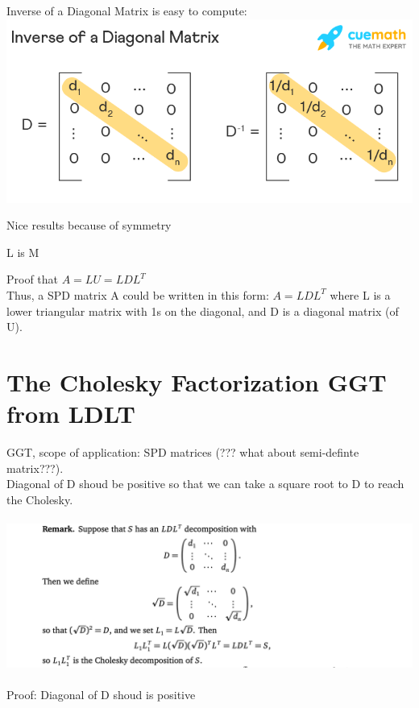 \documentclass{article}
\begin{document}
\noindent
Inverse of a Diagonal Matrix is easy to compute:\\
\includegraphics[width=1\linewidth]{lec6-2.png}

\noindent
Nice results because of symmetry

L is M

\noindent
Proof that $A = LU = LDL^T$\\

\noindent
Thus, a SPD matrix A could be written in this form: $A = LDL^T$
where L is a lower triangular matrix with 1s on the diagonal, and D is a diagonal matrix (of U).\\



\pagebreak
\section{The Cholesky Factorization GGT from LDLT}

GGT, scope of application: SPD matrices (??? what about semi-definte matrix???).\\

Diagonal of D shoud be positive so that we can take a square root to D to reach the Cholesky.\\
\\
\includegraphics[width=1.5\linewidth]{lec6-3.png}\\
\\
\medskip
Proof: Diagonal of D shoud is positive
\end{document}
